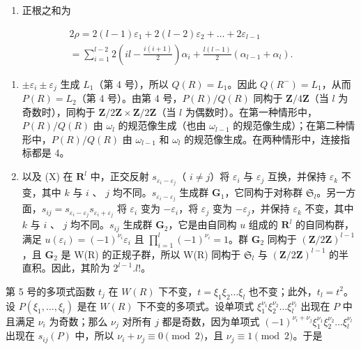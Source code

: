 \begin{enumerate}
\def\labelenumi{(\Roman{enumi})}
\setcounter{enumi}{6}
\tightlist
\item
  正根之和为
\end{enumerate}

\[
\begin{array}{l} 2 \rho = 2 (l - 1) \varepsilon_ {1} + 2 (l - 2) \varepsilon_ {2} + \dots + 2 \varepsilon_ {l - 1} \\ = \sum_ {i = 1} ^ {l - 2} 2 (i l - \frac {i (i + 1)}{2}) \alpha_ {i} + \frac {l (l - 1)}{2} (\alpha_ {l - 1} + \alpha_ {l}). \end{array}
\]

\begin{enumerate}
\def\labelenumi{(\Roman{enumi})}
\setcounter{enumi}{7}
\item
  \(\pm \varepsilon_{i} \pm \varepsilon_{j}\) 生成 \(L_{1}\)（第 4 号），所以 \(Q(R) = L_{1}\)。因此 \(Q(R^{-}) = L_{1}\)，从而 \(P(R) = L_{2}\)（第 4 号）。由第 4 号，\(P(R)/Q(R)\) 同构于 \(\mathbf{Z}/4\mathbf{Z}\)（当 \(l\) 为奇数时），同构于 \(\mathbf{Z}/2\mathbf{Z} \times \mathbf{Z}/2\mathbf{Z}\)（当 \(l\) 为偶数时）。在第一种情形中，\(P(R)/Q(R)\) 由 \(\omega_{l}\) 的规范像生成（也由 \(\omega_{l-1}\) 的规范像生成）；在第二种情形中，\(P(R)/Q(R)\) 由 \(\omega_{l-1}\) 和 \(\omega_{l}\) 的规范像生成。在两种情形中，连接指标都是 4。
\item
  以及 (X) 在 \(\mathbf{R}^l\) 中，正交反射 \(s_{\varepsilon_i - \varepsilon_j}\)（ \(i \neq j\)）将 \(\varepsilon_i\) 与 \(\varepsilon_j\) 互换，并保持 \(\varepsilon_k\) 不变，其中 \(k\) 与 \(i\) 、 \(j\) 均不同。\(s_{\varepsilon_i - \varepsilon_j}\) 生成群 \(\mathbf{G}_1\)，它同构于对称群 \(\mathfrak{S}_l\)。另一方面，\(s_{ij} = s_{\varepsilon_i - \varepsilon_j} s_{\varepsilon_i + \varepsilon_j}\) 将 \(\varepsilon_i\) 变为 \(-\varepsilon_i\)，将 \(\varepsilon_j\) 变为 \(-\varepsilon_j\)，并保持 \(\varepsilon_k\) 不变，其中 \(k\) 与 \(i\) 、 \(j\) 均不同。\(s_{ij}\) 生成群 \(\mathbf{G}_2\)，它是由自同构 \(u\) 组成的 \(\mathbf{R}^l\) 的自同构群，满足 \(u(\varepsilon_i) = (-1)^{\nu_i} \varepsilon_i\) 且 \(\prod_{i=1}^{l} (-1)^{\nu_i} = 1\)。群 \(\mathbf{G}_2\) 同构于 \((\mathbf{Z}/2\mathbf{Z})^{l-1}\)，且 \(\mathbf{G}_2\) 是 W(R) 的正规子群，所以 W(R) 同构于 \(\mathfrak{S}_l\) 与 \((\mathbf{Z}/2\mathbf{Z})^{l-1}\) 的半直积。因此，其阶为 \(2^{l-1}.l!\)。
\end{enumerate}

 第 5 号的多项式函数 \(t_j\) 在 \(W(R)\) 下不变，\(t = \xi_1\xi_2\ldots\xi_l\) 也不变；此外，\(t_l = t^2\)。设 \(P(\xi_1,\ldots ,\xi_l)\) 是在 \(W(R)\) 下不变的多项式。设单项式 \(\xi_1^{\nu_1}\xi_2^{\nu_2}\ldots\xi_l^{\nu_l}\) 出现在 \(P\) 中且满足 \(\nu_{i}\) 为奇数；那么 \(\nu_{j}\) 对所有 \(j\) 都是奇数，因为单项式 \((-1)^{\nu_i + \nu_j}\xi_1^{\nu_1}\xi_2^{\nu_2}\ldots\xi_l^{\nu_l}\) 出现在 \(s_{ij}(P)\) 中，所以 \(\nu_{i} + \nu_{j} \equiv 0 \pmod{2}\)，且 \(\nu_{j} \equiv 1 \pmod{2}\)。于是

